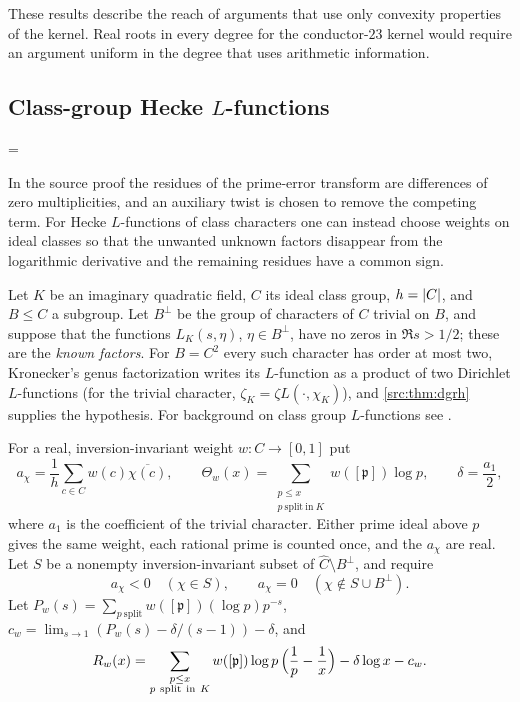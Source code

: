 These results describe the reach of arguments that use only convexity properties of the kernel. Real
roots in every degree for the conductor-$23$ kernel would require an argument uniform in the degree that
uses arithmetic information.

\subsection{Class-group Hecke \texorpdfstring{$L$}{L}-functions}\label{hec:ss:classgroup}
{\emergencystretch=\textwidth{}}

In the source proof the residues of the prime-error transform are differences of zero multiplicities, and
an auxiliary twist is chosen to remove the competing term. For Hecke $L$-functions of class characters one
can instead choose weights on ideal classes so that the unwanted unknown factors disappear from the
logarithmic derivative and the remaining residues have a common sign.

Let $K$ be an imaginary quadratic field, $C$ its ideal class group, $h=\lvert C\rvert$, and $B\le C$ a subgroup.
Let $B^\perp$ be the group of characters of $C$ trivial on $B$, and suppose that the functions
$L_K(s,\eta)$, $\eta\in B^\perp$, have no zeros in $\Re s>1/2$; these are the \emph{known factors}. For
$B=C^2$ every such character has order at most two, Kronecker's genus factorization writes its
$L$-function as a product of two Dirichlet $L$-functions (for the trivial character,
$\zeta_K=\zeta L(\cdot,\chi_K)$), and \cref{src:thm:dgrh} supplies the hypothesis. For background on
class group $L$-functions see \cite{DukeFriedlanderIwaniec1995Class}.

For a real, inversion-invariant weight $w\colon C\to[0,1]$ put
\[
 a_\chi=\frac1h\sum_{c\in C}w(c)\overline{\chi(c)},\qquad
 \Theta_w(x)=\sum_{\substack{p\le x\\p\ \mathrm{split\ in}\ K}}w([\mathfrak p])\log p,\qquad
 \delta=\frac{a_1}2,
\]
where $a_1$ is the coefficient of the trivial character. Either prime ideal above $p$ gives the same
weight, each rational prime is counted once, and the $a_\chi$ are real. Let $S$ be a nonempty
inversion-invariant subset of $\widehat C\setminus B^\perp$, and require
\begin{equation}\label{hec:eq:weightcond}
 a_\chi<0\quad(\chi\in S),\qquad a_\chi=0\quad(\chi\notin S\cup B^\perp).
\end{equation}
Let $P_w(s)=\sum_{p\ \mathrm{split}}w([\mathfrak p])(\log p)p^{-s}$,
$c_w=\lim_{s\to1}(P_w(s)-\delta/(s-1))-\delta$, and
\[
 R_w(x)=\sum_{\substack{p\le x\\p\ \mathrm{split\ in}\ K}}w([\mathfrak p])\log p\,
 \Bigl(\frac1p-\frac1x\Bigr)-\delta\log x-c_w .
\]

